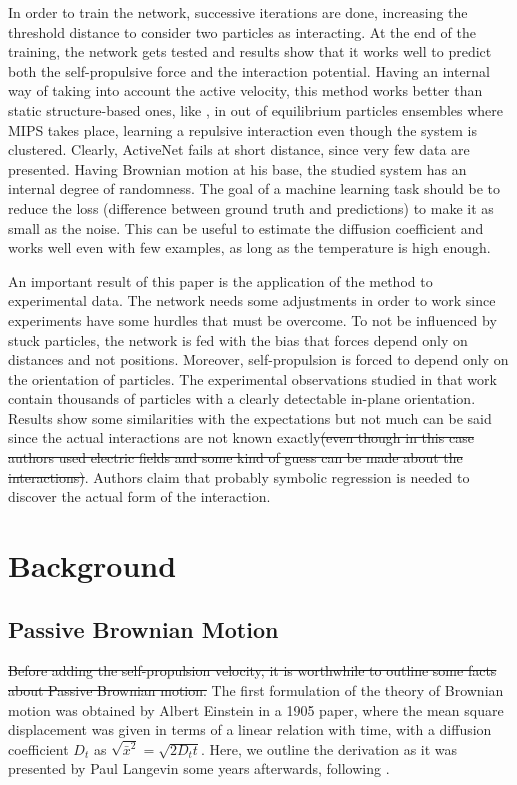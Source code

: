 \documentclass[../../master_thesis_np.tex]{subfiles}
\begin{document}
	In order to train the network, successive iterations are done, increasing the threshold distance to consider two particles as interacting. 
	At the end of the training, the network gets tested and results show that it works well to predict both the self-propulsive force and the interaction potential. 
	Having an internal way of taking into account the active velocity, this method works better than static structure-based ones, like \cite{bag_interaction_2021}, in out of equilibrium particles ensembles where MIPS takes place, learning a repulsive interaction even though the system is clustered. 
	Clearly, ActiveNet fails at short distance, since very few data are presented. 
	Having Brownian motion at his base, the studied system has an internal degree of randomness. 
	The goal of a machine learning task should be to reduce the loss (difference between ground truth and predictions) to make it as small as the noise. 
	This can be useful to estimate the diffusion coefficient and works well even with few examples, as long as the temperature is high enough. 
	
	An important result of this paper is the application of the method to experimental data. 
	The network needs some adjustments in order to work since experiments have some hurdles that must be overcome. 
	To not be influenced by stuck particles, the network is fed with the bias that forces depend only on distances and not positions. 
	Moreover, self-propulsion is forced to depend only on the orientation of particles. 
	The experimental observations studied in that work contain thousands of particles with a clearly detectable in-plane orientation. 
	Results show some similarities with the expectations but not much can be said since the actual interactions are not known exactly\sout{(even though in this case authors used electric fields and some kind of guess can be made about the interactions)}. 
	Authors claim that probably symbolic regression is needed to discover the actual form of the interaction.
	
	\section{Background}
	\subsection{Passive Brownian Motion}

	\sout{Before adding the self-propulsion velocity, it is worthwhile to outline some facts about Passive Brownian motion.}
	The first formulation of the theory of Brownian motion was obtained by Albert Einstein in a 1905 paper, where the mean square displacement was given in terms of a linear relation with time, with a diffusion coefficient $D_t$ as $\sqrt{\bar{x}^2} = \sqrt{2D_t t}$. 
	Here, we outline the derivation as it was presented by Paul Langevin some years afterwards, following \cite{gardiner_handbook_2004}.
	
\end{document}
